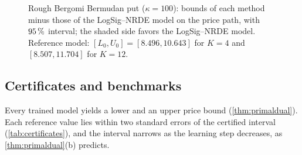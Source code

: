 \begin{figure}[htbp]
\centering
\resizebox{\textwidth}{!}{}
\caption{Rough Bergomi Bermudan put ($\kappa=100$): bounds of each method minus those of the LogSig--NRDE model on the price path, with $95\,\%$ interval; the shaded side favors the LogSig--NRDE model. Reference model: $[L_0,U_0]=[8.496,10.643]$ for $K=4$ and $[8.507,11.704]$ for $K=12$.}
\label{fig:rough}
\end{figure}

\subsection{Certificates and benchmarks}\label{sec:exp-benchmarks}

Every trained model yields a lower and an upper price bound (\cref{thm:primaldual}). Each reference value lies within two standard errors of the certified interval (\cref{tab:certificates}), and the interval narrows as the learning step decreases, as \cref{thm:primaldual}(b) predicts.

